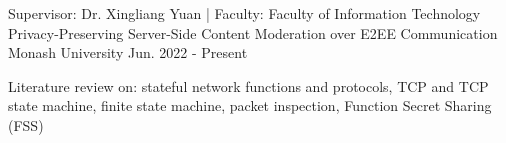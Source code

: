 

\begin{cventries}


   \cventry
   {Supervisor: Dr. Xingliang Yuan | Faculty: Faculty of Information Technology} %
   {Privacy-Preserving Server-Side Content Moderation over E2EE Communication} %
   {Monash University} %
   {Jun. 2022 - Present} %
   {
      \begin{cvitems} %
         \item {Literature review on: stateful network functions and protocols, TCP and TCP state machine, finite state machine, packet inspection, Function Secret Sharing (FSS)}
      \end{cvitems}
   }

\end{cventries}
\vspace{-3.0mm}
